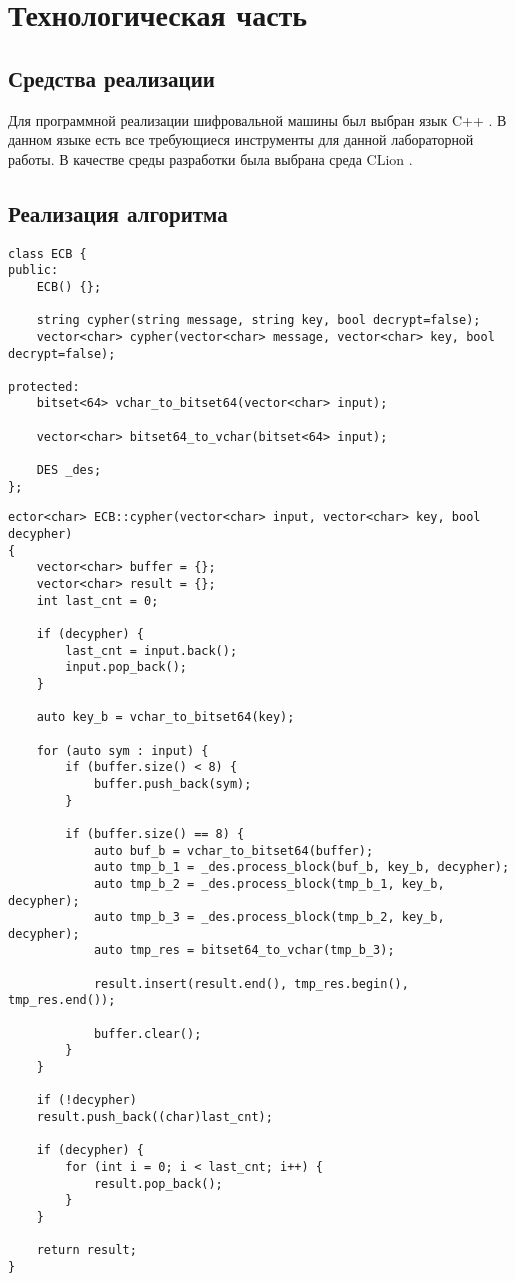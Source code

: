\chapter{Технологическая часть}

\section{Средства реализации}

Для программной реализации шифровальной машины был выбран язык C++ \cite{cpp}.
В данном языке есть все требующиеся инструменты для данной лабораторной работы.
В качестве среды разработки была выбрана среда CLion \cite{clion}.

\section{Реализация алгоритма}

\begin{lstlisting}[label=lst:ecb,caption=Класс реализации режима ECB]
class ECB {
public:
	ECB() {};
	
	string cypher(string message, string key, bool decrypt=false);
	vector<char> cypher(vector<char> message, vector<char> key, bool decrypt=false);
	
protected:
	bitset<64> vchar_to_bitset64(vector<char> input);
	
	vector<char> bitset64_to_vchar(bitset<64> input);
	
	DES _des;
};
\end{lstlisting}


\clearpage

\begin{lstlisting}[label=lst:ecb,caption=Реализация метода шифрования и дешифрования 3DES в режиме ECB]
ector<char> ECB::cypher(vector<char> input, vector<char> key, bool decypher)
{
	vector<char> buffer = {};
	vector<char> result = {};
	int last_cnt = 0;
	
	if (decypher) {
		last_cnt = input.back();
		input.pop_back();
	}

	auto key_b = vchar_to_bitset64(key);
	
	for (auto sym : input) {
		if (buffer.size() < 8) {
			buffer.push_back(sym);
		}
		
		if (buffer.size() == 8) {
			auto buf_b = vchar_to_bitset64(buffer);
			auto tmp_b_1 = _des.process_block(buf_b, key_b, decypher);
			auto tmp_b_2 = _des.process_block(tmp_b_1, key_b, decypher);
			auto tmp_b_3 = _des.process_block(tmp_b_2, key_b, decypher);
			auto tmp_res = bitset64_to_vchar(tmp_b_3);
			
			result.insert(result.end(), tmp_res.begin(), tmp_res.end());
			
			buffer.clear();
		}
	}
	
	if (!decypher)
	result.push_back((char)last_cnt);
	
	if (decypher) {
		for (int i = 0; i < last_cnt; i++) {
			result.pop_back();
		}
	}
	
	return result;
}
\end{lstlisting}

